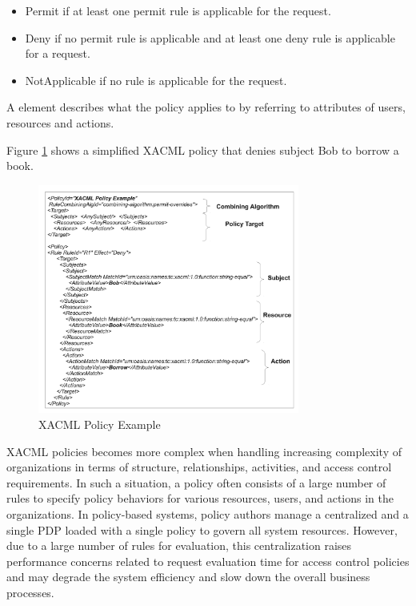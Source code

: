 \begin{itemize}
\item Permit if at least one permit rule is applicable for the request.
\item Deny if no permit rule is applicable and at least one deny rule is applicable for a request.
\item NotApplicable if no rule is applicable for the request.
\end{itemize}

A  element describes what the policy applies to by referring to attributes of users, resources and actions.

Figure \ref{figur1} shows a simplified XACML policy that denies subject Bob to borrow a book.

\begin{figure}[!h]
\begin{center}
\includegraphics[width=8.6cm]{xacml}
\caption{XACML Policy Example}
\label{figur1}
\end{center}
\end{figure}


XACML policies becomes more complex when handling increasing complexity of organizations in terms of structure, relationships, activities, and access control requirements. In such a situation, a policy 
often consists of a large number of rules to specify policy behaviors for various resources, users, and actions in the organizations.
In policy-based systems, policy authors manage a centralized and a single PDP loaded with a single policy to govern all system resources. 
However, due to a large number of rules for evaluation, this centralization raises performance concerns related to request evaluation time for access control policies and may 
degrade the system efficiency and slow down the overall business processes. 

